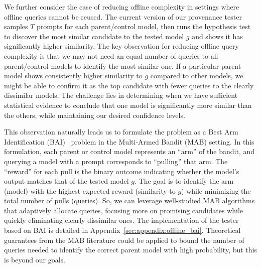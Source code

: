 We further consider the case of reducing offline complexity in settings where offline queries cannot be reused. The current version of our provenance tester samples $T$ prompts for each parent/control model, then runs the hypothesis test to discover the most similar candidate to the tested model $g$ and shows it has significantly higher similarity.
The key observation for reducing offline query complexity is that we may not need an equal number of queries to all parent/control models to identify the most similar one. If a particular parent model shows consistently higher similarity to $g$ compared to other models, we might be able to confirm it as the top candidate with fewer queries to the clearly dissimilar models. The challenge lies in determining when we have sufficient statistical evidence to conclude that one model is significantly more similar than the others, while maintaining our desired confidence levels.

This observation naturally leads us to formulate the problem as a Best Arm Identification (BAI)~\cite{audibert2010best} problem in the Multi-Armed Bandit (MAB) setting. In this formulation, each parent or control model represents an ``arm'' of the bandit, and querying a model with a prompt corresponds to ``pulling'' that arm. The ``reward'' for each pull is the binary outcome indicating whether the model's output matches that of the tested model $g$. The goal is to identify the arm (model) with the highest expected reward (similarity to $g$) while minimizing the total number of pulls (queries). So, we can leverage well-studied MAB algorithms that adaptively allocate queries, focusing more on promising candidates while quickly eliminating clearly dissimilar ones. The implementation of the tester based on BAI is detailed in Appendix~\ref{sec:appendix:offline_bai}. Theoretical guarantees from the MAB literature could be applied to bound the number of queries needed to identify the correct parent model with high probability, but this is beyond our goals.
